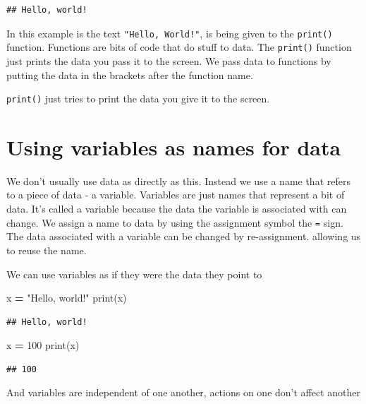 \documentclass[]{book}
\newenvironment{Shaded}{\begin{snugshade}}{\end{snugshade}}
\newcommand{\BuiltInTok}[1]{#1}
\newcommand{\DecValTok}[1]{\textcolor[rgb]{0.00,0.00,0.81}{#1}}
\newcommand{\NormalTok}[1]{#1}
\newcommand{\OperatorTok}[1]{\textcolor[rgb]{0.81,0.36,0.00}{\textbf{#1}}}
\newcommand{\StringTok}[1]{\textcolor[rgb]{0.31,0.60,0.02}{#1}}
\theoremstyle{definition}
\theoremstyle{definition}
\theoremstyle{definition}
\theoremstyle{remark}
\begin{document}
\begin{verbatim}
## Hello, world!
\end{verbatim}

In this example is the text \texttt{"Hello,\ World!"}, is being given to
the \texttt{print()} function. Functions are bits of code that do stuff
to data. The \texttt{print()} function just prints the data you pass it
to the screen. We pass data to functions by putting the data in the
brackets after the function name.

\texttt{print()} just tries to print the data you give it to the screen.

\hypertarget{using-variables-as-names-for-data}{%
\section{Using variables as names for
data}\label{using-variables-as-names-for-data}}

We don't usually use data as directly as this. Instead we use a name
that refers to a piece of data - a variable. Variables are just names
that represent a bit of data. It's called a variable because the data
the variable is associated with can change. We assign a name to data by
using the assignment symbol the \texttt{=} sign. The data associated
with a variable can be changed by re-assignment. allowing us to reuse
the name.

We can use variables as if they were the data they point to

\begin{Shaded}
\begin{Highlighting}[]
\NormalTok{x }\OperatorTok{=} \StringTok{"Hello, world!"}
\BuiltInTok{print}\NormalTok{(x)}
\end{Highlighting}
\end{Shaded}

\begin{verbatim}
## Hello, world!
\end{verbatim}

\begin{Shaded}
\begin{Highlighting}[]
\NormalTok{x }\OperatorTok{=} \DecValTok{100}
\BuiltInTok{print}\NormalTok{(x)}
\end{Highlighting}
\end{Shaded}

\begin{verbatim}
## 100
\end{verbatim}

And variables are independent of one another, actions on one don't
affect another
\end{document}
